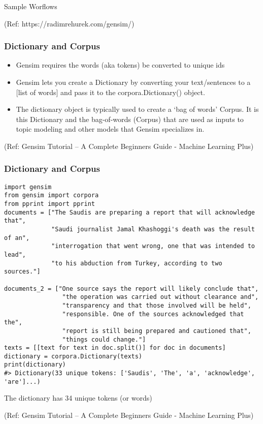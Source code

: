 \begin{frame}[fragile]\frametitle{}

\begin{center}
{\Large Sample Worflows}

{\tiny (Ref: https://radimrehurek.com/gensim/)}

\end{center}

\end{frame}


\begin{frame}[fragile]\frametitle{Dictionary and Corpus}

\begin{itemize}
\item Gensim requires the words (aka tokens) be converted to unique ids
\item Gensim lets you create a Dictionary by converting your text/sentences to a [list of words] and pass it to the corpora.Dictionary() object.
\item The dictionary object is typically used to create a ‘bag of words’ Corpus. It is this Dictionary and the bag-of-words (Corpus) that are used as inputs to topic modeling and other models that Gensim specializes in.
\end{itemize}

\tiny{(Ref: Gensim Tutorial – A Complete Beginners Guide - Machine Learning Plus)}
\end{frame}


\begin{frame}[fragile]\frametitle{Dictionary and Corpus}

\begin{lstlisting}
import gensim
from gensim import corpora
from pprint import pprint
documents = ["The Saudis are preparing a report that will acknowledge that", 
             "Saudi journalist Jamal Khashoggi's death was the result of an", 
             "interrogation that went wrong, one that was intended to lead", 
             "to his abduction from Turkey, according to two sources."]

documents_2 = ["One source says the report will likely conclude that", 
                "the operation was carried out without clearance and", 
                "transparency and that those involved will be held", 
                "responsible. One of the sources acknowledged that the", 
                "report is still being prepared and cautioned that", 
                "things could change."]
texts = [[text for text in doc.split()] for doc in documents]
dictionary = corpora.Dictionary(texts)
print(dictionary)
#> Dictionary(33 unique tokens: ['Saudis', 'The', 'a', 'acknowledge', 'are']...)
\end{lstlisting}

The dictionary has 34 unique tokens (or words)

\tiny{(Ref: Gensim Tutorial – A Complete Beginners Guide - Machine Learning Plus)}
\end{frame}

